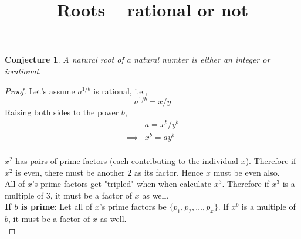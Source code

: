 \documentclass{article}
\title{Roots – rational or not}
\newtheorem*{conjecture}{Conjecture}
\newtheorem*{corollary}{Corollary}
\begin{document}
\maketitle

\begin{conjecture}A natural root of a natural number is either
    an integer or irrational.
\end{conjecture}
\begin{proof}Let's assume $a^{1/b}$ is rational, i.e.,
    $$a^{1/b} = x/y$$
    Raising both sides to the power $b$,
    \begin{align*}
        & a = x^b/y^b\\
        \implies & x^b = a y^b\\
    \end{align*}
    
    $x^2$ has pairs of prime factors
    (each contributing to the individual $x$). Therefore
    if $x^2$ is even, there must be another $2$ as its factor.
    Hence $x$ must be even also.\\

    All of $x$'s prime factors get "tripled" when when
    calculate $x^3$. Therefore if $x^3$ is a multiple of $3$, 
    it must be a factor of $x$ as well.\\

    \textbf{If $b$ is prime}: Let all of $x$'s prime factors 
    be $\{p_1,p_2,\dots,p_x\}$. If $x^b$ is a multiple of $b$, 
    it must be a factor of $x$ as well.\\

\end{proof}
    
% 
    
\end{document}
